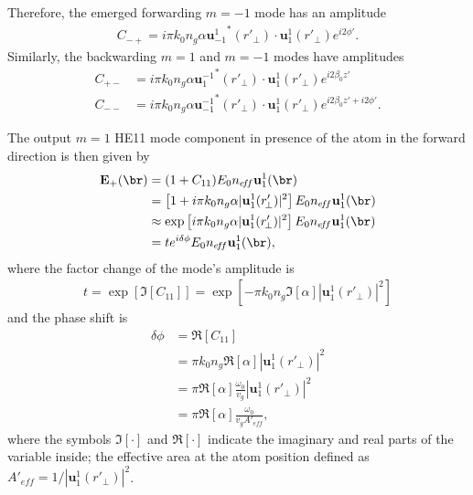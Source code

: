 \documentclass[]{report}
\begin{document}
Therefore, the emerged forwarding $ m=-1 $ mode has an amplitude 
\begin{align}
C_{-+}=i\pi k_0 n_g\alpha  {\mathbf{u}^1_{-1}}^*(r'_{\!\perp})\cdot \mathbf{u}_1^1(r'_{\!\perp})e^{i2\phi'}.
\end{align}
Similarly, the backwarding $ m=1 $ and $ m=-1 $ modes have amplitudes 
\begin{align}
C_{+-} &=i\pi k_0 n_g\alpha  {\mathbf{u}^{-1}_1}^*(r'_{\!\perp})\cdot \mathbf{u}_1^1(r'_{\!\perp})e^{i2\beta_0 z'}\\
C_{--} &=i\pi k_0 n_g\alpha  {\mathbf{u}^{-1}_{-1}}^*(r'_{\!\perp})\cdot \mathbf{u}_1^1(r'_{\!\perp})e^{i2\beta_0 z'+i2\phi'}.
\end{align}

The output $ m=1 $ HE11 mode component in presence of the atom in the forward direction is then given by
\begin{align}
\mathbf{E}_+(\br) &= (1+C_{11})E_0n_{e\!f\!f}\mathbf{u}_{1}^{1} (\br)\\
&=\left[1 +i\pi k_0 n_g\alpha  | \mathbf{u}_1^1(r'_{\!\perp})|^2 \right] E_0n_{e\!f\!f}\mathbf{u}_{1}^{1} (\br)\\
&\approx \exp\left[i\pi k_0 n_g\alpha  | \mathbf{u}_1^1(r'_{\!\perp})|^2 \right] E_0n_{e\!f\!f}\mathbf{u}_{1}^{1} (\br)\\
&= te^{i\delta\phi}E_0n_{e\!f\!f}\mathbf{u}_{1}^{1} (\br), 
\end{align}
where the factor change of the mode's amplitude is 
\begin{align}
t=\exp\left[\Im[C_{11}]\right]=\exp\left[ -\pi k_0 n_g \Im[\alpha]  | \mathbf{u}_1^1(r'_{\!\perp})|^2 \right]
\end{align}
and the phase shift is
\begin{align}
\delta\phi &= \Re[C_{11}]\\
&=\pi k_0 n_g\Re[\alpha]  | \mathbf{u}_1^1(r'_{\!\perp})|^2\\
&= \pi \Re[\alpha] \frac{\omega_0}{v_g}  | \mathbf{u}_1^1(r'_{\!\perp})|^2\\
&= \pi \Re[\alpha] \frac{\omega_0}{v_gA'_{e\!f\!f}},
\end{align}
where the symbols $ \Im[\cdot] $ and $ \Re[\cdot] $ indicate the imaginary and real parts of the variable inside; the effective area at the atom position defined as $ A'_{e\!f\!f}=1/| \mathbf{u}_1^1(r'_{\!\perp})|^2 $. 
\end{document}
